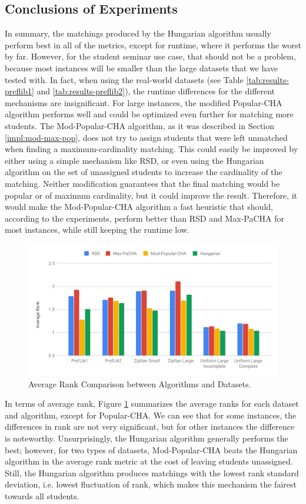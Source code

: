 \subsection{Conclusions of Experiments}
In summary, the matchings produced by the Hungarian algorithm usually perform best in all of the metrics, except for runtime, where it performs the worst by far. However, for the student seminar use case, that should not be a problem, because most instances will be smaller than the large datasets that we have tested with. In fact, when using the real-world datasets (see Table \ref{tab:results-preflib1} and \ref{tab:results-preflib2}), the runtime differences for the different mechanisms are insignificant. For large instances, the modified Popular-CHA algorithm performs well and could be optimized even further for matching more students. The Mod-Popular-CHA algorithm, as it was described in Section \ref{impl:mod-max-pop}, does not try to assign students that were left unmatched when finding a maximum-cardinality matching. This could easily be improved by either using a simple mechanism like RSD, or even using the Hungarian algorithm on the set of unassigned students to increase the cardinality of the matching. Neither modification guarantees that the final matching would be popular or of maximum cardinality, but it could improve the result. Therefore, it would make the Mod-Popular-CHA algorithm a fast heuristic that should, according to the experiments, perform better than RSD and Max-PaCHA for most instances, while still keeping the runtime low.

\begin{figure}[h!]
  \centering
    \includegraphics[width=0.8\linewidth]{assets/plots/average_ranks_all.pdf}
    \caption{Average Rank Comparison between Algorithms and Datasets.}
    \label{fig:average_ranks}
\end{figure}

In terms of average rank, Figure \ref{fig:average_ranks} summarizes the average ranks for each dataset and algorithm, except for Popular-CHA. We can see that for some instances, the differences in rank are not very significant, but for other instances the difference is noteworthy. Unsurprisingly, the Hungarian algorithm generally performs the best; however, for two types of datasets, Mod-Popular-CHA beats the Hungarian algorithm in the average rank metric at the cost of leaving students unassigned. Still, the Hungarian algorithm produces matchings with the lowest rank standard deviation, i.e. lowest fluctuation of rank, which makes this mechanism the fairest towards all students.

